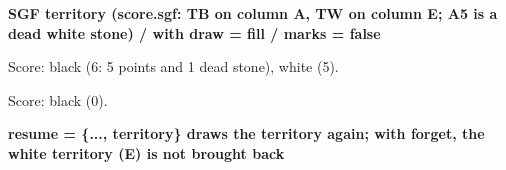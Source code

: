 \documentclass{article}
\newcommand\case[1]{\par\medskip\noindent\textbf{#1}\par\nopagebreak}
\begin{document}
\case{SGF territory (score.sgf: TB on column A, TW on column E; A5 is a dead white stone) / with draw = fill / marks = false}
\begin{goban}[5]\end{goban}
Score: black  (6: 5 points and 1 dead stone), white  (5).
{\begin{goban}[5]\end{goban}}
\begin{goban}[5]\end{goban}
Score: black  (0).

\case{resume = \{..., territory\} draws the territory again; with forget, the white territory (E) is not brought back}
\begin{goban}[5, name = terr]
\end{goban}
\begin{goban}[5, resume = {terr, territory}]\end{goban}
\end{document}
